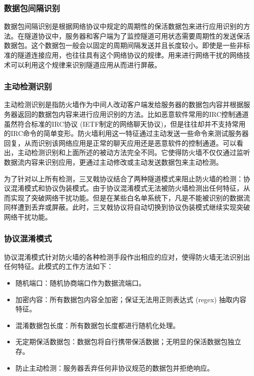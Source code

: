 \documentclass[a4paper]{article}
\begin{document}
\subsubsection{数据包间隔识别}
数据包间隔识别是根据网络协议中规定的周期性的保活数据包来进行应用识别的方法。在隧道协议中，服务器和客户端为了监控隧道可用状态需要周期性的发送保活数据包。这个数据包一般会以固定的周期间隔发送并且长度较小。即使是一些非标准的隧道连接应用，也往往具有这个网络协议的规律。用来进行网络干扰的网络技术可以利用这个规律来识别隧道应用从而进行屏蔽。

\subsubsection{主动检测识别}
主动检测识别是指防火墙作为中间人改动客户端发给服务器的数据包内容并根据服务器返回的数据包内容来进行应用识别的方法。比如恶意软件常用的IRC\cite{reed1993rfc}控制通道虽然符合标准的IRC协议 (IETF制定的网络聊天协议)，但是往往却并不支持常用的IRC命令的简单变形。防火墙利用这一特征通过主动发送一些命令来测试服务器回复，从而识别该网络应用是正常的聊天应用还是恶意软件的控制通道。可以看出，主动检测识别和上面所述的被动方法完全不同。它使得防火墙不仅仅通过监听数据流内容来识别应用，更通过主动修改或主动发送数据包来主动检测。

为了针对以上所有检测，三叉戟协议结合了两种隧道模式来阻止防火墙的检测：协议混淆模式和协议伪装模式。由于协议混淆模式无法被防火墙检测出任何特征，从而实现了突破网络干扰功能。但是在某些白名单系统下，凡是不能被识别的数据流同样遭到丢弃或屏蔽。此时，三叉戟协议将自动切换到协议伪装模式继续实现突破网络干扰功能。

\subsubsection{协议混淆模式}
协议混淆模式针对防火墙的各种检测手段作出相应的应对，使得防火墙无法识别出任何特征。此模式的工作方法如下：

\begin{itemize}
\item 随机端口：随机协商端口作为数据流端口。

\item 加密内容：所有数据包内容全加密；保证无法用正则表达式 (regex) 抽取内容特征。

\item 混淆数据包长度：所有数据包长度都进行随机化处理。

\item 无定期保活数据包：数据包将自行携带保活数据；无明显的保活数据包独立存。

\item 防止主动检测：服务器丢弃任何非协议规范的数据包并拒绝响应。
\end{itemize}
\end{document}
